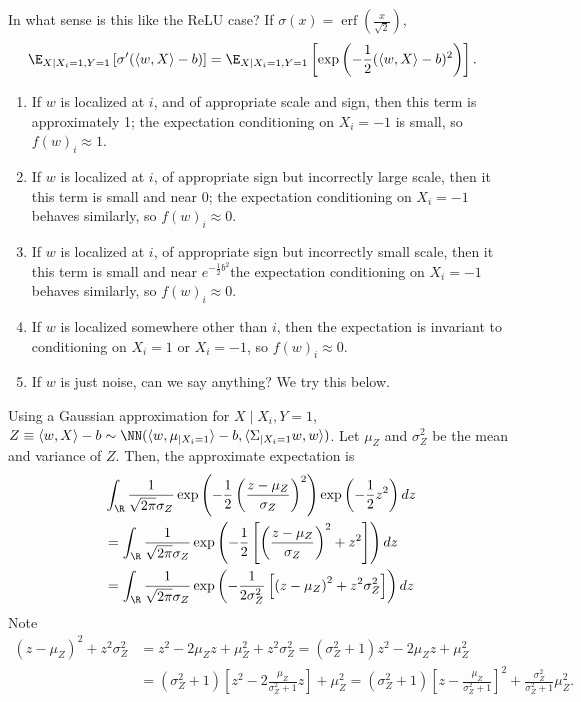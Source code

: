 \documentclass[usletter,twoside,12pt]{book}
\begin{document}
In what sense is this like the ReLU case?
If $\sigma(x) = \operatorname{erf}(\frac{x}{\sqrt{2}})$,
\begin{align}
   \E_{X \mid X_i=1, Y=1} \left[ \sigma'( \langle w, X \rangle - b ) \right]
   &= \E_{X \mid X_i=1, Y=1} \left[ \exp\left( -\frac{1}{2} ( \langle w, X \rangle - b )^2 \right) \right].
\end{align}
\begin{enumerate}
   \item If $w$ is localized at $i$, and of appropriate scale and sign, then this term is approximately 1; the expectation conditioning on $X_i = -1$ is small, so $f(w)_i \approx 1$. 
   \item If $w$ is localized at $i$, of appropriate sign but incorrectly large scale, then it this term is small and near 0; the expectation conditioning on $X_i = -1$ behaves similarly, so $f(w)_i \approx 0$.
   \item If $w$ is localized at $i$, of appropriate sign but incorrectly small scale, then it this term is small and near $e^{-\frac{1}{2}b^2}$the expectation conditioning on $X_i = -1$ behaves similarly, so $f(w)_i \approx 0$.
   \item If $w$ is localized somewhere other than $i$, then the expectation is invariant to conditioning on $X_i = 1$ or $X_i = -1$, so $f(w)_i \approx 0$.
   \item If $w$ is just noise, can we say anything? We try this below.
\end{enumerate}
Using a Gaussian approximation for $X \mid X_i, Y=1$, $Z \equiv \langle w, X \rangle - b \sim \NN( \langle w, \mu_{\mid X_i=1} \rangle - b, \langle \Sigma_{\mid X_i=1} w, w \rangle )$.
Let $\mu_Z$ and $\sigma_Z^2$ be the mean and variance of $Z$.
Then, the approximate expectation is
\begin{align}
   &\int_{\R} \frac{1}{\sqrt{2 \pi} \sigma_Z} \exp\left( -\frac{1}{2} \left( \frac{z - \mu_Z}{\sigma_Z} \right)^2 \right) \exp\left( -\frac{1}{2} z^2 \right) dz \\
   &= \int_{\R} \frac{1}{\sqrt{2 \pi} \sigma_Z} \exp\left( -\frac{1}{2} \left[ \left( \frac{z - \mu_Z}{\sigma_Z} \right)^2 + z^2 \right] \right) dz \\
   &= \int_{\R} \frac{1}{\sqrt{2 \pi} \sigma_Z} \exp\left( -\frac{1}{2 \sigma_Z^2} \left[ \left(z - \mu_Z \right)^2 + z^2 \sigma_Z^2 \right] \right) dz \\
\end{align}
Note
\begin{align*}
   \left(z - \mu_Z \right)^2 + z^2 \sigma_Z^2
   &= z^2 - 2 \mu_Z z + \mu_Z^2 + z^2 \sigma_Z^2
   = (\sigma_Z^2 + 1) z^2 - 2 \mu_Z z + \mu_Z^2 \\
   &= (\sigma_Z^2 + 1) \left[ z^2 - 2 \frac{ \mu_Z }{ \sigma_Z^2 + 1 } z \right] + \mu_Z^2 
   = (\sigma_Z^2 + 1) \left[ z - \frac{ \mu_Z }{ \sigma_Z^2 + 1 } \right]^2 + \frac{ \sigma_Z^2 }{ \sigma_Z^2 + 1 } \mu_Z^2.
\end{align*}
\end{document}
